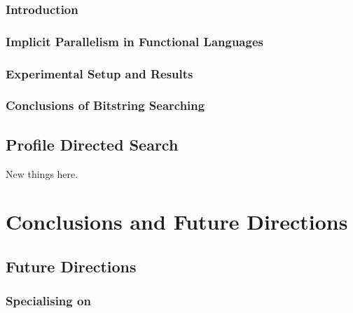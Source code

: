 \documentclass[dottedtoc, headinclude, footinclude=true, a4paper, numbers=noenddot]{scrreprt}
\begin{document}
        \section{Introduction}
        
    
        \section{Implicit Parallelism in Functional Languages}
        \label{sec:blind-ParFunc}
        
    
        \section{Experimental Setup and Results}
        \label{sec:blind-Results}
        
    
        \section{Conclusions of Bitstring Searching}
        \label{sec:blind-Conclusion}
        
    
    \chapter{Profile Directed Search}
    \label{chap:prof-search}
    
        New things here.
        \label{sec:informed-search}
        


\part{Conclusions and Future Directions}
\label{part:conclusion}

    \chapter{Future Directions}
    \label{chap:future}
    
        
    
        \section{Specialising on \underline{\hspace{2cm}}}
        
    
\end{document}

